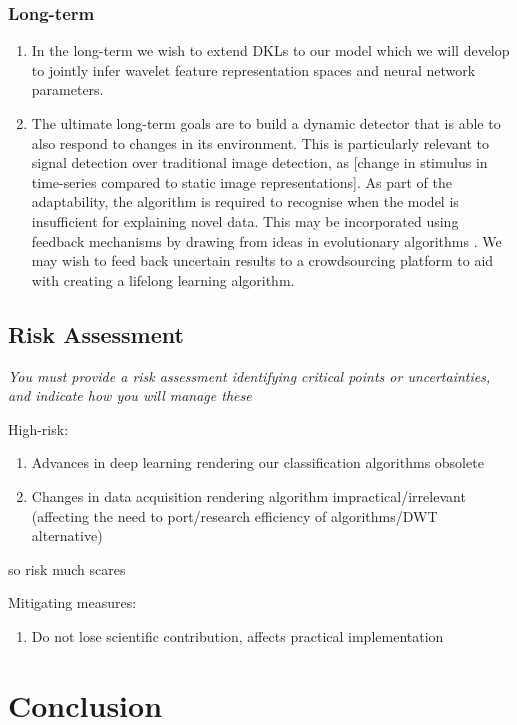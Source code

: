 \documentclass[12pt]{llncs}
\begin{document}
\subsubsection{Long-term}
\begin{enumerate}
	\item In the long-term we wish to extend DKLs to our model which we will develop to jointly infer wavelet feature representation spaces and neural network parameters.
	\item The ultimate long-term goals are to build a dynamic detector that is able to also respond to changes in its environment. This is particularly relevant to signal detection over traditional image detection, as [change in stimulus in time-series compared to static image representations]. As part of the adaptability, the algorithm is required to recognise when the model is insufficient for explaining novel data. This may be incorporated using feedback mechanisms by drawing from ideas in evolutionary algorithms \cite{coello2007evolutionary}. We may wish to feed back uncertain results to a crowdsourcing platform to aid with creating a lifelong learning algorithm.
\end{enumerate}



\subsection{Risk Assessment}
\emph{You must provide a risk assessment identifying critical points or uncertainties, and indicate how you will manage these}

High-risk: 
\begin{enumerate} 
\item Advances in deep learning rendering our classification algorithms obsolete
\item Changes in data acquisition rendering algorithm impractical/irrelevant (affecting the need to port/research efficiency of algorithms/DWT alternative)

\end{enumerate}

so risk much scares

Mitigating measures:
\begin{enumerate}
	\item Do not lose scientific contribution, affects practical implementation
\end{enumerate}

\section{Conclusion}
\label{sec:conclusion}




\end{document}
